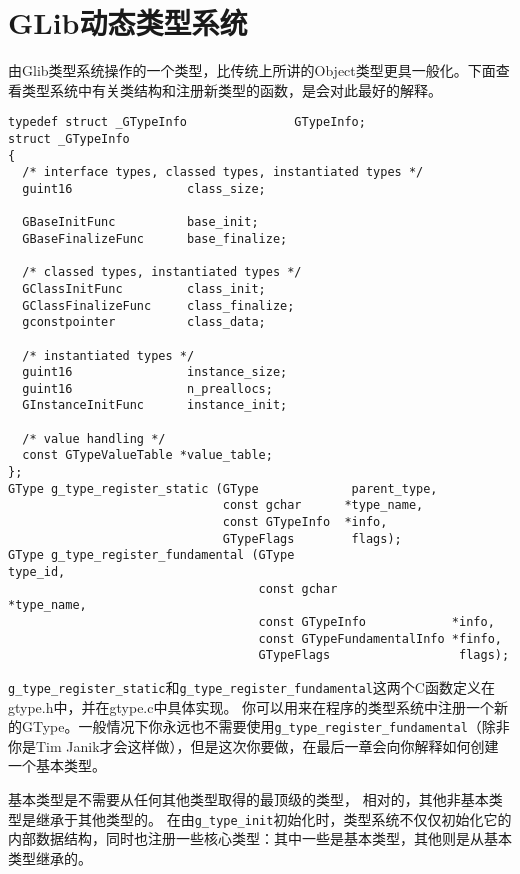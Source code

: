 \chapter{GLib动态类型系统}
由Glib类型系统操作的一个类型，比传统上所讲的Object类型更具一般化。下面查看类型系统中有关类结构和注册新类型的函数，是会对此最好的解释。

\begin{verbatim}
typedef struct _GTypeInfo               GTypeInfo;
struct _GTypeInfo
{
  /* interface types, classed types, instantiated types */
  guint16                class_size;

  GBaseInitFunc          base_init;
  GBaseFinalizeFunc      base_finalize;

  /* classed types, instantiated types */
  GClassInitFunc         class_init;
  GClassFinalizeFunc     class_finalize;
  gconstpointer          class_data;

  /* instantiated types */
  guint16                instance_size;
  guint16                n_preallocs;
  GInstanceInitFunc      instance_init;

  /* value handling */
  const GTypeValueTable *value_table;
};
GType g_type_register_static (GType             parent_type,
                              const gchar      *type_name,
                              const GTypeInfo  *info,
                              GTypeFlags        flags);
GType g_type_register_fundamental (GType                       type_id,
                                   const gchar                *type_name,
                                   const GTypeInfo            *info,
                                   const GTypeFundamentalInfo *finfo,
                                   GTypeFlags                  flags);
\end{verbatim}
\verb|g_type_register_static|和\verb|g_type_register_fundamental|这两个C函数定义在gtype.h中，并在gtype.c中具体实现。
你可以用来在程序的类型系统中注册一个新的GType。一般情况下你永远也不需要使用\verb|g_type_register_fundamental|（除非你是Tim Janik才会这样做），但是这次你要做，在最后一章会向你解释如何创建一个基本类型。

基本类型是不需要从任何其他类型取得的最顶级的类型， 相对的，其他非基本类型是继承于其他类型的。
在由\verb|g_type_init|初始化时，类型系统不仅仅初始化它的内部数据结构，同时也注册一些核心类型：其中一些是基本类型，其他则是从基本类型继承的。

